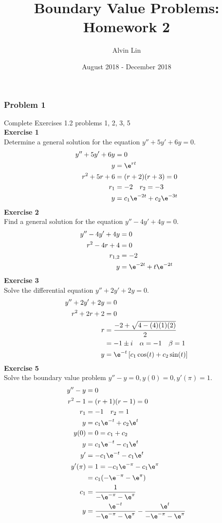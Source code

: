 \documentclass{math}
\title{Boundary Value Problems: Homework 2}
\author{Alvin Lin}
\date{August 2018 - December 2018}
\begin{document}
\maketitle

\subsubsection*{Problem 1}
Complete Exercises 1.2 problems 1, 2, 3, 5 \\
\textbf{Exercise 1} \\
Determine a general solution for the equation \( y''+5y'+6y = 0 \).
\begin{align*}
  y''+5y'+6y &= 0 \\
  y &= \e^{rt} \\
  r^2+5r+6 &= (r+2)(r+3) = 0 \\
  r_1 &= -2 \quad r_2 = -3 \\
  y &= c_1\e^{-2t}+c_2\e^{-3t}
\end{align*}
\textbf{Exercise 2} \\
Find a general solution for the equation \( y''-4y'+4y = 0 \).
\begin{align*}
  y''-4y'+4y &= 0 \\
  r^2-4r+4 &= 0 \\
  r_{1,2} &= -2 \\
  y &= \e^{-2t}+t\e^{-2t}
\end{align*}
\textbf{Exercise 3} \\
Solve the differential equation \( y''+2y'+2y = 0 \).
\begin{align*}
  y''+2y'+2y &= 0 \\
  r^2+2r+2 &= 0 \\
  r &= \frac{-2+\sqrt{4-(4)(1)(2)}}{2} \\
  &= -1\pm i \quad \alpha = -1 \quad \beta = 1 \\
  y &= \e^{-t}\left[c_1\cos(t)+c_2\sin(t)\right]
\end{align*}
\textbf{Exercise 5} \\
Solve the boundary value problem \( y''-y = 0, y(0) = 0, y'(\pi) = 1 \).
\begin{align*}
  y''-y &= 0 \\
  r^2-1 &= (r+1)(r-1) = 0 \\
  r_1 &= -1 \quad r_2 = 1 \\
  y &= c_1\e^{-t}+c_2\e^t \\
  y(0) &= 0 = c_1+c_2 \\
  y &= c_1\e^{-t}-c_1\e^t \\
  y' &= -c_1\e^{-t}-c_1\e^t \\
  y'(\pi) &= 1 = -c_1\e^{-\pi}-c_1\e^{\pi} \\
  &= c_1(-\e^{-\pi}-\e^{\pi}) \\
  c_1 &= \frac{1}{-\e^{-\pi}-\e^{\pi}} \\
  y &= \frac{\e^{-t}}{-\e^{-\pi}-\e^{\pi}}-\frac{\e^t}{-\e^{-\pi}-\e^{\pi}}
\end{align*}
\end{document}

